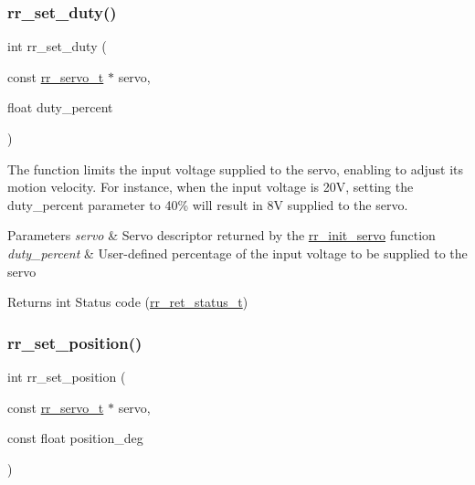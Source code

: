 \subsubsection{\texorpdfstring{rr\+\_\+set\+\_\+duty()}{rr\_set\_duty()}}
{\footnotesize\ttfamily int rr\+\_\+set\+\_\+duty (\begin{DoxyParamCaption}\item[{const \hyperlink{structrr__servo__t}{rr\+\_\+servo\+\_\+t} $\ast$}]{servo,  }\item[{float}]{duty\+\_\+percent }\end{DoxyParamCaption})}



The function limits the input voltage supplied to the servo, enabling to adjust its motion velocity. For instance, when the input voltage is 20V, setting the duty\+\_\+percent parameter to 40\% will result in 8V supplied to the servo. 


\begin{DoxyParams}{Parameters}
{\em servo} & Servo descriptor returned by the \hyperlink{group___common_ga0adb313a3eeb8a4399431e940a1f3e9e}{rr\+\_\+init\+\_\+servo} function \\
\hline
{\em duty\+\_\+percent} & User-\/defined percentage of the input voltage to be supplied to the servo \\
\hline
\end{DoxyParams}
\begin{DoxyReturn}{Returns}
int Status code (\hyperlink{api_8h_a92d5be5038abcf89837faf85a08debdc}{rr\+\_\+ret\+\_\+status\+\_\+t}) 
\end{DoxyReturn}
\mbox{\label{group___servo__control_gaddb31db79640ec345eb237ddc4d1078f}} 
\subsubsection{\texorpdfstring{rr\+\_\+set\+\_\+position()}{rr\_set\_position()}}
{\footnotesize\ttfamily int rr\+\_\+set\+\_\+position (\begin{DoxyParamCaption}\item[{const \hyperlink{structrr__servo__t}{rr\+\_\+servo\+\_\+t} $\ast$}]{servo,  }\item[{const float}]{position\+\_\+deg }\end{DoxyParamCaption})}




